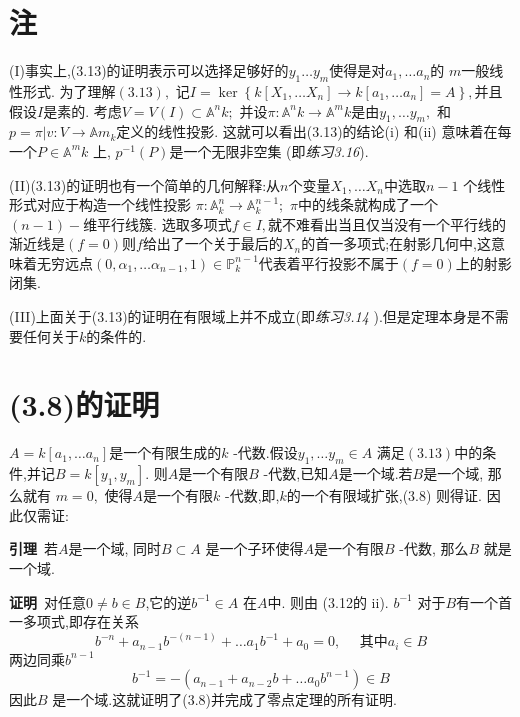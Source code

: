 \documentclass[UTF8]{book}
\begin{document}
		
		
	\section{注}
		(I)事实上,(3.13)的证明表示可以选择足够好的$y_{1} \ldots y_{m}$使得是对$a_{1}, \dots a_{n}$的 $m$一般线性形式. 为了理解$(3.13),$ 记$I = \ker \left\{ k \left[ X _{1}, \ldots X _{ n }\right] \rightarrow k \left[ a _{1}, \ldots a _{ n }\right]= A \right\},$并且假设$ I $是素的. 考虑$V = V (I ) \subset \mathbb{A} ^{ n } k ;$ 并设$\pi: \mathbb{A} ^{ n } k \rightarrow \mathbb{A} ^{ m } k$是由$y_{1}, \dots y_{m},$ 和 $p=\pi | v: V \rightarrow \mathbb{A} m_{k}$定义的线性投影. 这就可以看出(3.13)的结论(i) 和(ii)  意味着在每一个$P \in \mathbb{A} ^{ m } k $ 上, $ p ^{-1}(P )$是一个无限非空集 (即\textit{练习3.16}).
		
		
		(II)(3.13)的证明也有一个简单的几何解释:从$ n $个变量$X _{1}, \ldots X _{ n }$中选取$n -1$ 个线性形式对应于构造一个线性投影 $\pi: \mathbb{A} ^{n}_{k} \rightarrow \mathbb{A} ^{n-1}_{k} ;$ $\pi$中的线条就构成了一个 $(n-1)-$维平行线簇. 选取多项式$f \in I ,$就不难看出当且仅当没有一个平行线的渐近线是$ (f = 0) $则$f$给出了一个关于最后的$X_{n}$的首一多项式;在射影几何中,这意味着无穷远点$\left(0, \alpha_{1}, \dots \alpha_{n-1}, 1\right) \in \mathbb{P} ^{n-1}_{k}$代表着平行投影不属于$ (f = 0) $上的射影闭集.
		
		
		(III)上面关于(3.13)的证明在有限域上并不成立(即\textit{练习3.14 }).但是定理本身是不需要任何关于$ k $的条件的.
		
		
	\section{(3.8)的证明}
		$A=k\left[a_{1}, \ldots a_{n}\right]$是一个有限生成的$k$ -代数.假设$y _{1}, \ldots y _{ m } \in A$ 满足$(3.13)$中的条件,并记$B = k \left[ y _{1}, y _{ m }\right] .$ 则$A$是一个有限$B$ -代数,已知$A$是一个域.若$B$是一个域, 那么就有 $m =0,$ 使得$A$是一个有限$k$ -代数,即,$k $的一个有限域扩张,(3.8) 则得证. 因此仅需证:
		
		\textbf{引理}\ 若$A$是一个域, 同时$B \subset A$ 是一个子环使得$A$是一个有限$B$ -代数, 那么$B$ 就是一个域.
		
		\textbf{证明}\ 对任意$0 \neq b \in B$,它的逆$b ^{-1} \in A$ 在$ A $中. 则由 (3.12的 ii). $b ^{-1}$ 对于$B$有一个首一多项式,即存在关系
		\begin{equation*}
		b ^{- n }+ a _{ n -1} b ^{-(n -1)}+\ldots a _{1} b ^{-1}+ a _{0}=0, \quad \text { 其中} a _{ i } \in B
		\end{equation*}
		两边同乘$b ^{ n -1}$
		\begin{equation*}
		b ^{-1}=-\left(a _{ n -1}+ a _{ n -2} b +\ldots a _{0} b ^{ n -1}\right) \in B
		\end{equation*}
		因此$B$ 是一个域.这就证明了(3.8)并完成了零点定理的所有证明.
		
\end{document}
